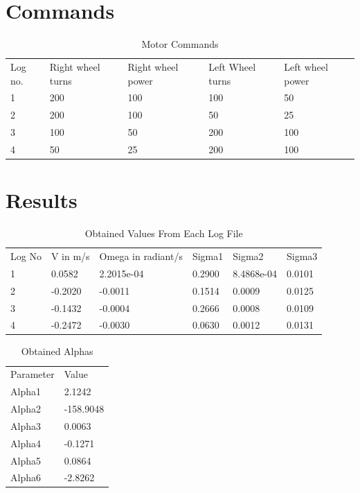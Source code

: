 \documentclass[paper=a4, fontsize=11pt]{scrartcl} %
\numberwithin{equation}{section} %
\numberwithin{figure}{section} %
\numberwithin{table}{section} %
\begin{document}
\begin{appendix}
\section{Commands}
\begin{table}[]
\centering
\caption{Motor Commands}
\label{table:commands}
\begin{tabular}{lllll}
Log no. & Right wheel turns & Right wheel power & Left Wheel turns & Left wheel power \\
1       & 200               & 100               & 100              & 50               \\
2       & 200               & 100               & 50               & 25               \\
3       & 100               & 50                & 200              & 100              \\
4       & 50                & 25                & 200              & 100             
\end{tabular}
\end{table}

\section{Results}
\begin{table}[]
\centering
\caption{Obtained Values From Each Log File}
\label{table:logs}
\begin{tabular}[H]{llllll}
Log No & V in m/s & Omega in radiant/s  & Sigma1 & Sigma2     & Sigma3 \\
1      & 0.0582   & 2.2015e-04  & 0.2900 & 8.4868e-04 & 0.0101 \\
2      & -0.2020  & -0.0011    & 0.1514 & 0.0009     & 0.0125 \\
3      & -0.1432  & -0.0004    & 0.2666 & 0.0008     & 0.0109 \\
4      & -0.2472  & -0.0030    & 0.0630 & 0.0012     & 0.0131
\end{tabular}
\end{table}

\begin{table}[H]
\centering
\caption{Obtained Alphas}
\label{table:Alphas}
\begin{tabular}{ll}
Parameter & Value     \\
Alpha1    & 2.1242    \\
Alpha2    & -158.9048 \\
Alpha3    & 0.0063    \\
Alpha4    & -0.1271   \\
Alpha5    & 0.0864    \\
Alpha6    & -2.8262  
\end{tabular}
\end{table}


\end{appendix}
\end{document}
